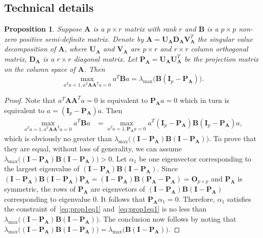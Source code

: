 \documentclass[12pt]{article} %
\newcommand{\bA}{\mathbf{A}}
\newcommand{\bB}{\mathbf{B}}
\newcommand{\bP}{\mathbf{P}}
\newcommand{\bO}{\mathbf{O}}
\newcommand{\bI}{\mathbf{I}}
\newcommand{\bU}{\mathbf{U}}
\newcommand{\bD}{\mathbf{D}}
\newcommand{\bV}{\mathbf{V}}
\newtheorem{proposition}{Proposition}
\theoremstyle{definition}
\begin{document}
\begin{appendices}
    \section{Technical details}\label{app}

\begin{proposition}\label{optProp}
    Suppose $\bA$ is a $p\times r$ matrix with rank $r$ and $\bB$ is a $p\times p$  non-zero positive semi-definite matrix.
    Denote by $\bA=\bU_\bA \bD_\bA \bV_\bA^T$ the singular value decomposition of $\bA$, where $\bU_\bA$ and $\bV_\bA$ are $p\times r$ and $r\times r$ column orthogonal matrix, $\bD_\bA$ is a $r\times r$ diagonal matrix.
    Let $\bP_\bA=\bU_\bA \bU_\bA^T$ be the projection matrix on the column space of $\bA$.
    Then
    \begin{equation}
        \max_{a^T a=1, a^T \bA \bA^T a=0}a^T \bB a=
        \lambda_{\max}\big(\bB(\bI_p-\bP_\bA)\big).
    \end{equation}
\end{proposition}
\begin{proof}
    Note that $a^T \bA \bA^T a=0$ is equivalent to $\bP_\bA a=0$ which in turn is equivalent to $a= (\bI_p-\bP_\bA)a$.
    Then
    \begin{equation}\label{eq:prop1eq1}
        \begin{aligned}
        \max_{a^T a=1, a^T \bA \bA^T a=0}a^T \bB a
            &=
        \max_{a^T a=1, \bP_\bA a=0}a^T(\bI_p-\bP_\bA) \bB (\bI_p-\bP_\bA)a,
        \end{aligned}
    \end{equation}
    which is obviously no greater than $\lambda_{\max}\big((\bI-\bP_\bA)\bB(\bI-\bP_\bA)\big)$.
    To prove that they are equal,  without loss of generality, we can assume $\lambda_{\max}\big((\bI-\bP_\bA)\bB(\bI-\bP_\bA)\big)>0$.
    Let $\alpha_1$ be one eigenvector corresponding to the largest eigenvalue of $(\bI-\bP_\bA)\bB(\bI-\bP_\bA)$.
    Since $(\bI-\bP_\bA)\bB(\bI-\bP_\bA)\bP_\bA=(\bI-\bP_\bA)\bB(\bP_\bA-\bP_\bA)=\bO_{p\times p}$ and $\bP_\bA$ is symmetric, the rows of $\bP_\bA$ are eigenvetors of $(\bI-\bP_\bA)\bB(\bI-\bP_\bA)$ corresponding to eigenvalue $0$.
    It follows that $\bP_\bA\alpha_1=0$.
    Therefore, $\alpha_1$ satisfies the constraint of~\eqref{eq:prop1eq1} and~\eqref{eq:prop1eq1} is no less than $\lambda_{\max}\big((\bI-\bP_\bA)\bB(\bI-\bP_\bA)\big)$.
    The conclusion now follows by noting that $\lambda_{\max}\big((\bI-\bP_\bA)\bB(\bI-\bP_\bA)\big)=\lambda_{\max}\big( \bB(\bI-\bP_\bA)\big)$.
    

\end{proof}
\end{appendices}
\end{document}
